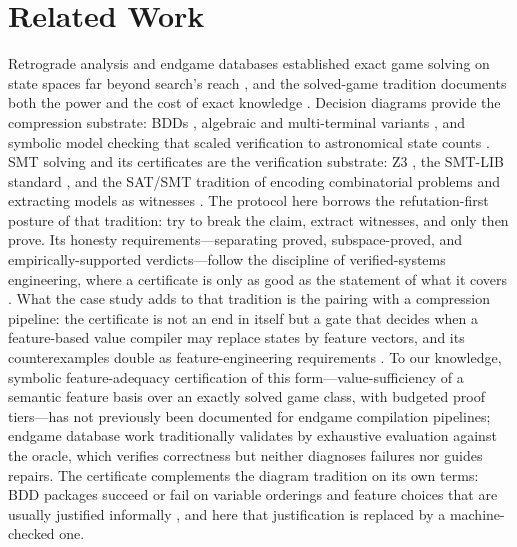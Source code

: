 \documentclass[conference]{IEEEtran}
\begin{document}
\section{Related Work}
Retrograde analysis and endgame databases established exact game solving on
state spaces far beyond search's reach \cite{thompson1986,nalimov2000}, and
the solved-game tradition documents both the power and the cost of exact
knowledge \cite{allis1994,schaeffer2007,vanherik2002}. Decision diagrams
provide the compression substrate: BDDs \cite{bryant1986,bryant1992},
algebraic and multi-terminal variants \cite{bahar1997,fujita1997}, and
symbolic model checking that scaled verification to astronomical state
counts \cite{burch1992}. SMT solving and its certificates are the
verification substrate: Z3 \cite{demoura2008,demoura2011,z3guide}, the
SMT-LIB standard \cite{barrett_smtlib}, and the SAT/SMT tradition of
encoding combinatorial problems and extracting models as witnesses
\cite{cook1971,kautz1996,biere2009}. The protocol here borrows the
refutation-first posture of that tradition: try to break the claim, extract
witnesses, and only then prove. Its honesty requirements---separating
proved, subspace-proved, and empirically-supported verdicts---follow the
discipline of verified-systems engineering, where a certificate is only as
good as the statement of what it covers \cite{leroy2009,klein2014}. What
the case study adds to that tradition is the pairing with a compression
pipeline: the certificate is not an end in itself but a gate that decides
when a feature-based value compiler may replace states by feature vectors,
and its counterexamples double as feature-engineering requirements
\cite{k2p2025,ccs2026}. To our knowledge, symbolic feature-adequacy
certification of this form---value-sufficiency of a semantic feature basis
over an exactly solved game class, with budgeted proof tiers---has not
previously been documented for endgame compilation pipelines; endgame
database work traditionally validates by exhaustive evaluation against the
oracle, which verifies correctness but neither diagnoses failures nor
guides repairs. The certificate complements the diagram tradition on its
own terms: BDD packages succeed or fail on variable orderings and feature
choices that are usually justified informally \cite{somenzi_cudd}, and
here that justification is replaced by a machine-checked one.
\end{document}
